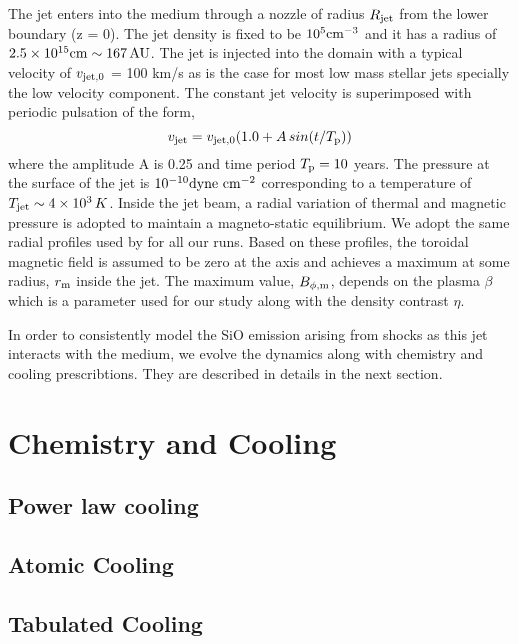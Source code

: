 \documentclass[useAMS,usenatbib,letters]{mn2e}
\begin{document}
The jet enters into the medium through a nozzle of radius $R_{\rm jet}$
from the lower boundary (z = 0). The jet density is fixed to
be $10^{5} \rm cm^{-3}$ and it has a radius of $2.5\times10^{15} \rm cm \sim
167\,AU$. The jet is injected into the domain with a typical 
velocity of $v_{\rm jet,0}$ = 100 km/s as is the case for most low mass stellar jets
specially the low velocity component. The constant jet velocity is
superimposed with periodic pulsation of the form,
\begin{equation}
v_{\rm jet} = v_{\rm jet,0}(1.0 + A\,sin(t/T_{\rm p}))
\end{equation}
where the amplitude A is 0.25 and time period $T_{\rm p} = 10$
years. The pressure at the surface of the jet is $10^{-10} \rm
dyne\,\,cm^{-2}$ corresponding to a temperature of $T_{\rm jet} \sim
4\times10^{3}\,K$. Inside the jet beam, a radial variation of thermal
and magnetic pressure is adopted to maintain a magneto-static
equilibrium. We adopt the
same radial profiles used by \cite{Stone:2000p2650} for all our runs. 
Based on these profiles, the toroidal magnetic field is assumed to be
zero at the axis and achieves a maximum at some radius, $r_{\rm m}$
inside the jet. The maximum value, $B_{\phi,\rm m}$, depends on the
plasma $\beta$ which is a parameter used for our study along with the
density contrast $\eta$.
%

In order to consistently model the SiO emission arising from shocks as
this jet interacts with the medium, we evolve the dynamics along with
chemistry and cooling prescribtions. They are described in details in
the next section.






 

\section{Chemistry and Cooling}
\label{sec:chem}
\subsection{Power law cooling}
\subsection{Atomic Cooling}
\subsection{Tabulated Cooling}
\end{document}
